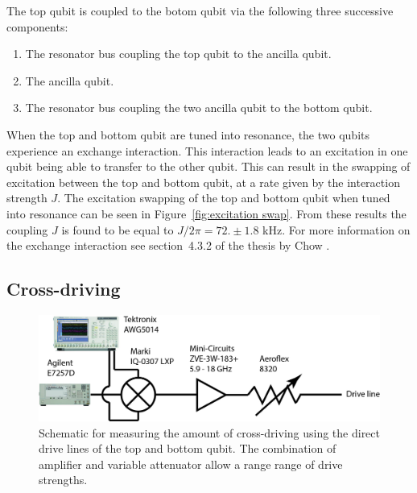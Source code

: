       The top qubit is coupled to the botom qubit via the following three successive components:

      \begin{enumerate}
        \item The resonator bus coupling the top qubit to the ancilla qubit.
        \item The ancilla qubit.
        \item The resonator bus coupling the two ancilla qubit to the bottom qubit.
      \end{enumerate}

      When the top and bottom qubit are tuned into resonance, the two qubits experience an exchange interaction. This interaction leads to an excitation in one qubit being able to transfer to the other qubit. This can result in the swapping of excitation between the top and bottom qubit, at a rate given by the interaction strength $J$. The excitation swapping of the top and bottom qubit when tuned into resonance can be seen in Figure~\ref{fig:excitation swap}. From these results the coupling $J$ is found to be equal to $J/2\pi=72. \pm 1.8$ kHz. For more information on the exchange interaction see section~4.3.2 of the thesis by Chow \cite{Chow}.

    \subsection{Cross-driving}
      \label{ssec:cross-driving}

      \begin{figure}[tb]
        \centering
        \includegraphics[width=.8\textwidth]{../Figures/Exploring frequency re-use/cross-driving_setup.jpg}
        \caption{Schematic for measuring the amount of cross-driving using the direct drive lines of the top and bottom qubit. The combination of amplifier and variable attenuator allow a range range of drive strengths.}
        \label{fig:cross-driving schematic}
      \end{figure}

